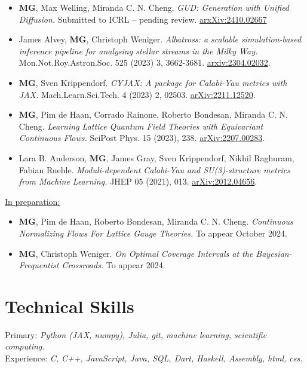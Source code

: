 \documentclass[11pt, a4paper]{article}
\begin{document}
\begin{itemize}[left=0pt, itemsep=5pt]
    \item \textbf{MG}, Max Welling, Miranda C. N. Cheng. \textit{GUD: Generation with Unified Diffusion.} Submitted to ICRL -- pending review. \href{https://arxiv.org/abs/2410.02667}{arxXiv:2410.02667}

    \item James Alvey, \textbf{MG}, Christoph Weniger. \textit{Albatross: a scalable simulation-based inference pipeline for analysing stellar streams in the Milky Way.} Mon.Not.Roy.Astron.Soc. 525 (2023) 3, 3662-3681. \href{https://arxiv.org/abs/2304.02032}{arxiv:2304.02032}.

    \item \textbf{MG}, Sven Krippendorf. \textit{CYJAX: A package for Calabi-Yau metrics with JAX.} Mach.Learn.Sci.Tech. 4 (2023) 2, 02503. \href{https://arxiv.org/abs/2211.12520}{arXiv:2211.12520}.

    \item \textbf{MG}, Pim de Haan, Corrado Rainone, Roberto Bondesan, Miranda C. N. Cheng. \textit{Learning Lattice Quantum Field Theories with Equivariant Continuous Flows.} SciPost Phys. 15 (2023), 238. \href{https://arxiv.org/abs/2207.00283}{arXiv:2207.00283}.

    \item Lara B. Anderson, \textbf{MG}, James Gray, Sven Krippendorf, Nikhil Raghuram, Fabian Ruehle. \textit{Moduli-dependent Calabi-Yau and SU(3)-structure metrics from Machine Learning.} JHEP 05 (2021), 013. \href{https://arxiv.org/abs/2012.04656}{arXiv:2012.04656}.
\end{itemize}

\underline{In preparation:}

\begin{itemize}[left=0pt, itemsep=5pt]
    \item \textbf{MG}, Pim de Haan, Roberto Bondesan, Miranda C. N. Cheng. \textit{Continuous Normalizing Flows For Lattice Gauge Theories.} To appear October 2024.
    \item \textbf{MG}, Christoph Weniger. \textit{On Optimal Coverage Intervals at the Bayesian-Frequentist Crossroads.} To appear 2024.
\end{itemize}


\section*{Technical Skills}
Primary: \textit{Python (JAX, numpy), Julia, git, machine learning, scientific computing.} \\
Experience: \textit{C, C++, JavaScript, Java, SQL, Dart, Haskell, Assembly, html, css.}
\end{document}
